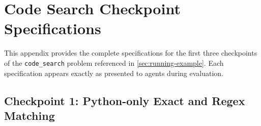 \section{Code Search Checkpoint Specifications}
\label{sec:appendix-code-search}

This appendix provides the complete specifications for the first three checkpoints of the \texttt{code\_search} problem referenced in \autoref{sec:running-example}. Each specification appears exactly as presented to agents during evaluation.

\subsection{Checkpoint 1: Python-only Exact and Regex Matching}
\label{sec:appendix-cp1}

